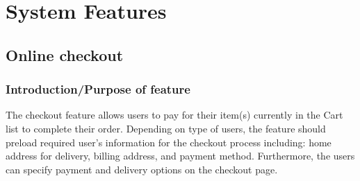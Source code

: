 \documentclass{scrreprt}
\theoremstyle{funreq}
\begin{document}
\section{System Features}



\subsection{Online checkout}

	
	
	
	
	
	\subsubsection{Introduction/Purpose of feature}
	The checkout feature allows users to pay for their item(s) currently in the Cart list to complete their order. Depending on type of users, the feature should preload required user’s information for the checkout process including: home address for delivery, billing address, and payment method. Furthermore, the users can specify payment and delivery options on the checkout page. 
	
\end{document}
